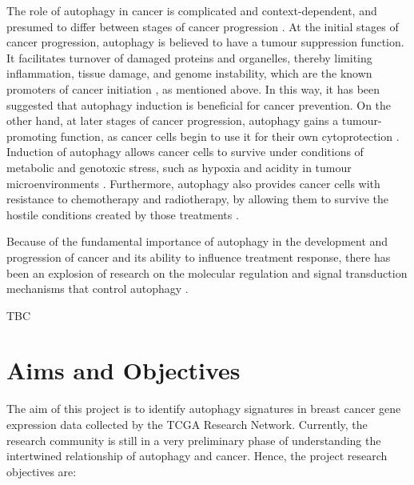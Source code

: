 The role of autophagy in cancer is complicated and context-dependent, and presumed to differ between stages of cancer progression \cite{Zarzynska2014}. At the initial stages of cancer progression, autophagy is believed to have a tumour suppression function. It facilitates turnover of damaged proteins and organelles, thereby limiting inflammation, tissue damage, and genome instability, which are the known promoters of cancer initiation \cite{Maycotte2014a}, as mentioned above. In this way, it has been suggested that autophagy induction is beneficial for cancer prevention. On the other hand, at later stages of cancer progression, autophagy gains a tumour-promoting function, as cancer cells begin to use it for their own cytoprotection  \cite{Zarzynska2014}. Induction of autophagy allows cancer cells to survive under conditions of metabolic and genotoxic stress, such as hypoxia and acidity in tumour microenvironments \cite{MathewAutophagyStronger}. Furthermore, autophagy also provides cancer cells with resistance to chemotherapy and radiotherapy, by allowing them to survive the hostile conditions created by those treatments  \cite{Jain2013AutophagyTherapy.}. 

Because of the fundamental importance of autophagy in the development and progression of cancer and its ability to influence treatment response, there has been an explosion of research on the molecular regulation and signal transduction mechanisms that control autophagy \cite{Jain2013AutophagyTherapy.}. 

TBC
\newpage
\section{Aims and Objectives}


The aim of this project is to identify autophagy signatures in breast cancer gene expression data collected by the TCGA Research Network. Currently, the research community is still in a very preliminary phase of understanding the intertwined relationship of autophagy and cancer. Hence, the project research objectives are:\\


